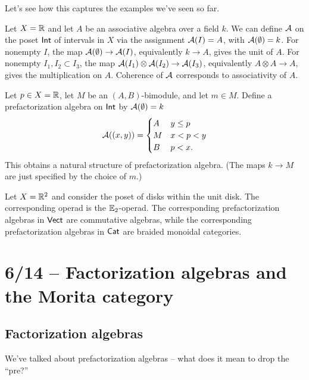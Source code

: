 Let's see how this captures the examples we've seen so far.

\begin{ex}
	Let $X = \mathbb{R}$ and let $A$ be an associative algebra over a field $k$.
	We can define $\mathcal{A}$ on the poset $\mathsf{Int}$ of intervals in $X$ via the assignment $\mathcal{A}(I) = A$, with $\mathcal{A}(\emptyset) = k$.
	For nonempty $I$, the map $\mathcal{A}(\emptyset) \to \mathcal{A}(I)$, equivalently $k \to A$, gives the unit of $A$.
	For nonempty $I_1, I_2 \subset I_3$, the map $\mathcal{A}(I_1) \otimes \mathcal{A}(I_2) \to \mathcal{A}(I_3)$, equivalently $A \otimes A \to A$, gives the multiplication on $A$.
	Coherence of $\mathcal{A}$ corresponds to associativity of $A$.
\end{ex}

\begin{ex}
	Let $p \in X = \mathbb{R}$, let $M$ be an $(A, B)$-bimodule, and let $m \in M$.
	Define a prefactorization algebra on $\mathsf{Int}$ by $\mathcal{A}(\emptyset) = k$
	\[
		\mathcal{A}((x, y)) = \begin{cases}
			A & y \leq p \\
			M & x < p < y \\
			B & p < x.
		\end{cases}
	\]
	This obtains a natural structure of prefactorization algebra.
	(The maps $k \to M$ are just specified by the choice of $m$.)
\end{ex}

\begin{ex}
	Let $X = \mathbb{R}^2$ and consider the poset of disks within the unit disk.
	The corresponding operad is the $\mathbb{E}_2$-operad.
	The corresponding prefactorization algebras in $\mathsf{Vect}$ are commutative algebras, while the corresponding prefactorization algebras in $\mathsf{Cat}$ are braided monoidal categories.
\end{ex}

\section{6/14 -- Factorization algebras and the Morita category}

\subsection{Factorization algebras}

We've talked about prefactorization algebras -- what does it mean to drop the ``pre?''

